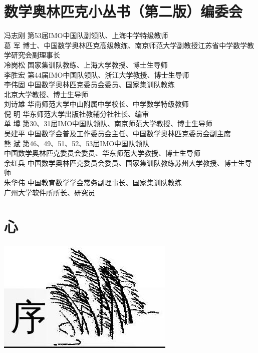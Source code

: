 \documentclass[10pt]{article}
\begin{document}
\section*{数学奥林匹克小丛书（第二版）编委会}
冯志刚 第53届IMO中国队副领队、上海中学特级教师\\
葛 军 博士、中国数学奥林匹克高级教练、南京师范大学副教授江苏省中学数学教学研究会副理事长\\
冷岗松 国家集训队教练、上海大学教授、博士生导师\\
李胜宏 第44届IMO中国队领队、浙江大学教授、博士生导师\\
李伟固 中国数学奥林匹克委员会委员、国家集训队教练\\
北京大学教授、博士生导师\\
刘诗雄 华南师范大学中山附属中学校长、中学数学特级教师\\
倪 明 华东师范大学出版社教辅分社社长、编审\\
单 墫 第30、31届IMO中国队领队、南京师范大学教授、博士生导师\\
吴建平 中国数学会普及工作委员会主任、中国数学奥林匹克委员会副主席\\
熊 斌 第46、49、51、52、53届IMO中国队领队\\
中国数学奥林匹克委员会委员、华东师范大学教授、博士生导师\\
余红兵 中国数学奥林匹克委员会委员、国家集训队教练苏州大学教授、博士生导师\\
朱华伟 中国教育数学学会常务副理事长、国家集训队教练\\
广州大学软件所所长、研究员

\section*{心}
\begin{center}
\includegraphics[max width=\textwidth]{2024_10_30_1bf34f7aeb61f11d11d3g-005}
\end{center}
\end{document}
